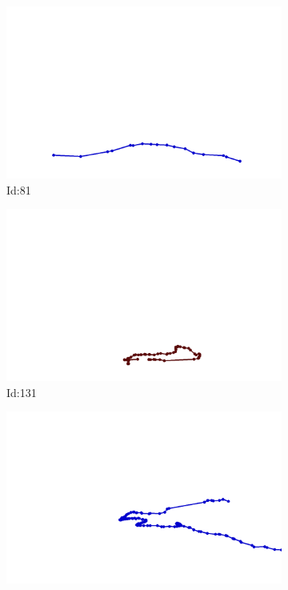 \documentclass[12pt,twoside]{report}
\begin{document}
\begin{figure}
\centering
\begin{subfigure}[b]{0.20\textwidth}
\centering
\includegraphics[width=\textwidth]{../../trajectories/81.png}
\caption{Id:81}
\end{subfigure}
\begin{subfigure}[b]{0.20\textwidth}
\centering
\includegraphics[width=\textwidth]{../../trajectories/131.png}
\caption{Id:131}
\end{subfigure}
\begin{subfigure}[b]{0.20\textwidth}
\centering
\includegraphics[width=\textwidth]{../../trajectories/151.png}

\end{subfigure}
\end{figure}
\end{document}
